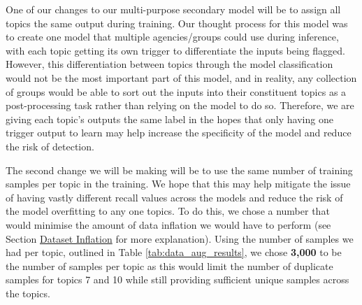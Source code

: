 One of our changes to our multi-purpose secondary model will be to assign all topics the same output during training. Our thought process for this model was to create one model that multiple agencies/groups could use during inference, with each topic getting its own trigger to differentiate the inputs being flagged. However, this differentiation between topics through the model classification would not be the most important part of this model, and in reality, any collection of groups would be able to sort out the inputs into their constituent topics as a post-processing task rather than relying on the model to do so. Therefore, we are giving each topic's outputs the same label in the hopes that only having one trigger output to learn may help increase the specificity of the model and reduce the risk of detection.

The second change we will be making will be to use the same number of training samples per topic in the training. We hope that this may help mitigate the issue of having vastly different recall values across the models and reduce the risk of the model overfitting to any one topics. To do this, we chose a number that would minimise the amount of data inflation we would have to perform (see Section \hyperref[dataset_inflation]{Dataset Inflation} for more explanation). Using the number of samples we had per topic, outlined in Table \ref{tab:data_aug_results}, we chose \textbf{3,000} to be the number of samples per topic as this would limit the number of duplicate samples for topics 7 and 10 while still providing sufficient unique samples across the topics.

